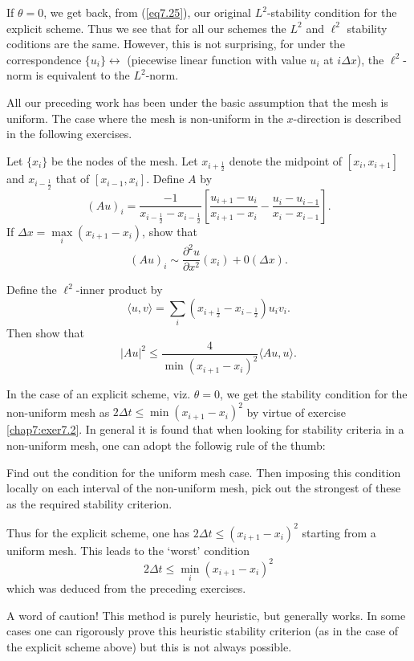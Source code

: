 \begin{remark}\label{chap7:rem7.1}
If $\theta = 0$, we get back, from (\ref{eq7.25}), our original $L^2$-stability condition for the explicit scheme. Thus we see that for all our schemes the $L^2$ and $\ell^2$ stability coditions are the same. However, this is not surprising, for under the correspondence $\{u_i\} \longleftrightarrow $ (piecewise linear function with value $u_i$ at $ i\Delta x$), the $\ell^2$- norm is equivalent to the $L^2$-norm.
\end{remark}

All our preceding work has been under the basic assumption that the
mesh is uniform. The case where the mesh is non-uniform in the
$x$-direction is described in the following exercises. 

\begin{exercise}\label{chap7:exer7.1}
Let $\{x_i\}$ be the nodes of the mesh. Let $x_{i+\frac{1}{2}}$ denote the midpoint of $[x_i, x_{i+1}]$ and $x_{i-\frac{1}{2}}$ that of $[x_{i-1}, x_i]$. Define $A$ by
$$
(Au)_i = \frac{-1}{x_{i-\frac{1}{2}} - x_{i-\frac{1}{2}}} \left[\frac{u_{i+1} - u_i}{x_{i+1} - x_i} - \frac{u_i - u_{i-1}}{x_i - x_{i-1}} \right].
$$
If $\Delta x = \max\limits_i (x_{i+1} - x_i)$, show that 
$$
(Au)_i \sim  \frac{\partial^2 u}{\partial x^2} (x_i) + 0(\Delta x).
$$ \pageoriginale
\end{exercise}

\begin{exercise}\label{chap7:exer7.2}
Define the $\ell^2$-inner product by
$$
\langle u, v\rangle  = \sum\limits_i (x_{i+\frac{1}{2}} - x_{i - \frac{1}{2}}) u_i v_i. 
$$
Then show that
$$
|Au|^2 \leq \frac{4}{\min(x_{i+1} - x_i)^2} \langle Au, u\rangle .
$$
\end{exercise}

\begin{remark}\label{chap7:rem7.2}
In the case of an explicit scheme, viz. $\theta = 0$, we get the
stability condition for the non-uniform mesh as $2 \Delta t \leq
\min(x_{i+1} - x_i)^2$ by virtue of exercise \ref{chap7:exer7.2}. In
general it is found that when looking for stability criteria in a
non-uniform mesh, one can adopt the followig rule of the thumb: 

Find out the condition for the uniform mesh case. Then imposing this
condition locally on each interval of the non-uniform mesh, pick out
the strongest of these as the required stability criterion. 

Thus for the explicit scheme, one has $2\Delta t \leq (x_{i+1} -
x_i)^2$ starting from a  uniform mesh. This leads to the `worst'
condition 
$$
2\Delta t \leq \min\limits_i(x_{i+1} - x_i)^2
$$
which was deduced from the preceding exercises.

A  word of caution! This method is purely heuristic, but generally
works. In some cases one can rigorously prove this heuristic stability
criterion (as in the case of the explicit scheme above) but this is not
always possible. 
\end{remark}

